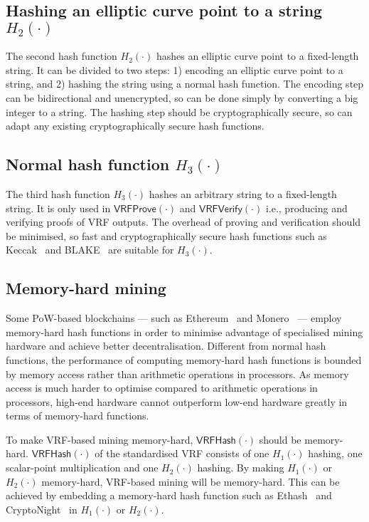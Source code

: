 \subsection{Hashing an elliptic curve point to a string $H_{2}(\cdot)$}
The second hash function $H_{2}(\cdot)$ hashes an elliptic curve point to a fixed-length string.
It can be divided to two steps: 1) encoding an elliptic curve point to a string, and 2) hashing the string using a normal hash function.
The encoding step can be bidirectional and unencrypted, so can be done simply by converting a big integer to a string.
The hashing step should be cryptographically secure, so can adapt any existing cryptographically secure hash functions.


\subsection{Normal hash function $H_{3}(\cdot)$}
The third hash function $H_{3}(\cdot)$ hashes an arbitrary string to a fixed-length string.
It is only used in $\mathsf{VRFProve}(\cdot)$ and $\mathsf{VRFVerify}(\cdot)$ i.e., producing and verifying proofs of VRF outputs.
The overhead of proving and verification should be minimised, so fast and cryptographically secure hash functions such as Keccak~\cite{bertoni2013keccak} and BLAKE~\cite{aumasson2008sha} are suitable for $H_{3}(\cdot)$.


\subsection{Memory-hard mining}
Some PoW-based blockchains --- such as Ethereum~\cite{wood2014ethereum} and Monero~\cite{monero} --- employ memory-hard hash functions in order to minimise advantage of specialised mining hardware and achieve better decentralisation.
Different from normal hash functions, the performance of computing memory-hard hash functions is bounded by memory access rather than arithmetic operations in processors.
As memory access is much harder to optimise compared to arithmetic operations in processors, high-end hardware cannot outperform low-end hardware greatly in terms of memory-hard functions.

To make VRF-based mining memory-hard, $\mathsf{VRFHash}(\cdot)$ should be memory-hard.
$\mathsf{VRFHash}(\cdot)$ of the standardised VRF consists of one $H_{1}(\cdot)$ hashing, one scalar-point multiplication and one $H_{2}(\cdot)$ hashing.
By making $H_{1}(\cdot)$ or $H_{2}(\cdot)$ memory-hard, VRF-based mining will be memory-hard.
This can be achieved by embedding a memory-hard hash function such as Ethash~\cite{wiki2017ethash} and CryptoNight~\cite{seigenneocortex} in $H_1(\cdot)$ or $H_2(\cdot)$.